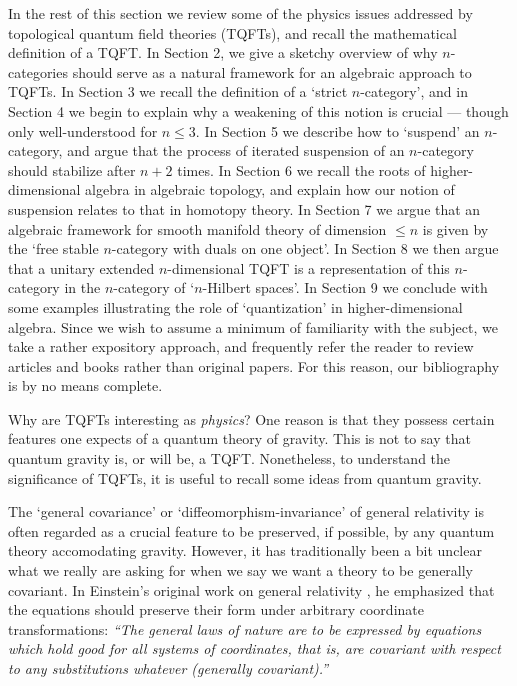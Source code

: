 In the rest of this section we review some of the physics issues
addressed by topological quantum field theories (TQFTs), and recall the
mathematical definition of a TQFT.  In Section 2, we give a sketchy
overview of why $n$-categories should serve as a natural framework for
an algebraic approach to TQFTs. In Section 3 we recall the definition of
a `strict $n$-category', and in Section 4 we begin to explain why a
weakening of this notion is crucial --- though only well-understood for
$n \le 3$.  In Section 5 we describe how to `suspend' an $n$-category,
and argue that the process of iterated suspension of an $n$-category
should stabilize after $n+2$ times.  In Section 6 we recall the roots of
higher-dimensional algebra in algebraic topology, and explain how our
notion of suspension relates to that in homotopy theory.  In Section 7
we argue that an algebraic framework for smooth manifold theory of
dimension $\le n$ is given by the `free stable $n$-category with duals
on one object'.  In Section 8 we then argue that a unitary extended
$n$-dimensional TQFT is a representation of this $n$-category in the
$n$-category of `$n$-Hilbert spaces'.  In Section 9 we conclude with
some examples illustrating the role of `quantization' in
higher-dimensional algebra.  Since we wish to assume a minimum of
familiarity with the subject, we take a rather expository approach, and
frequently refer the reader to review articles and books rather than
original papers.  For this reason, our bibliography is by no means
complete.

Why are TQFTs interesting as {\it physics}?  One reason is that
they possess certain features one expects of a quantum theory of
gravity.  This is not to say that quantum gravity is, or will be,
a TQFT.  Nonetheless, to understand the significance of TQFTs, it
is useful to recall some ideas from quantum gravity.

The `general covariance' or `diffeomorphism-invariance' of general
relativity is often regarded as a crucial feature to be preserved, if
possible, by any quantum theory accomodating gravity.  However, it has
traditionally been a bit unclear what we really are asking for when we
say we want a theory to be generally covariant.  In Einstein's original
work on general relativity \cite{Einstein}, he emphasized that the
equations should preserve their form under arbitrary coordinate
transformations: {\sl ``The general laws of nature are to be expressed
by equations which hold good for all systems of coordinates, that is,
are covariant with respect to any substitutions whatever (generally
covariant).''}

